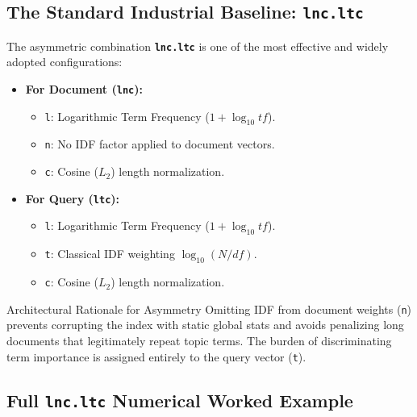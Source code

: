 \subsection{The Standard Industrial Baseline: \texttt{lnc.ltc}}
The asymmetric combination \textbf{\texttt{lnc.ltc}} is one of the most effective and widely adopted configurations:
\begin{itemize}
    \item \textbf{For Document (\texttt{lnc}):}
    \begin{itemize}
        \item \texttt{l}: Logarithmic Term Frequency ($1 + \log_{10} tf$).
        \item \texttt{n}: No IDF factor applied to document vectors.
        \item \texttt{c}: Cosine ($L_2$) length normalization.
    \end{itemize}
    \item \textbf{For Query (\texttt{ltc}):}
    \begin{itemize}
        \item \texttt{l}: Logarithmic Term Frequency ($1 + \log_{10} tf$).
        \item \texttt{t}: Classical IDF weighting $\log_{10}(N / df)$.
        \item \texttt{c}: Cosine ($L_2$) length normalization.
    \end{itemize}
\end{itemize}

\begin{noteblock}{Architectural Rationale for Asymmetry}
Omitting IDF from document weights (\texttt{n}) prevents corrupting the index with static global stats and avoids penalizing long documents that legitimately repeat topic terms. The burden of discriminating term importance is assigned entirely to the query vector (\texttt{t}).
\end{noteblock}

\subsection{Full \texttt{lnc.ltc} Numerical Worked Example}

